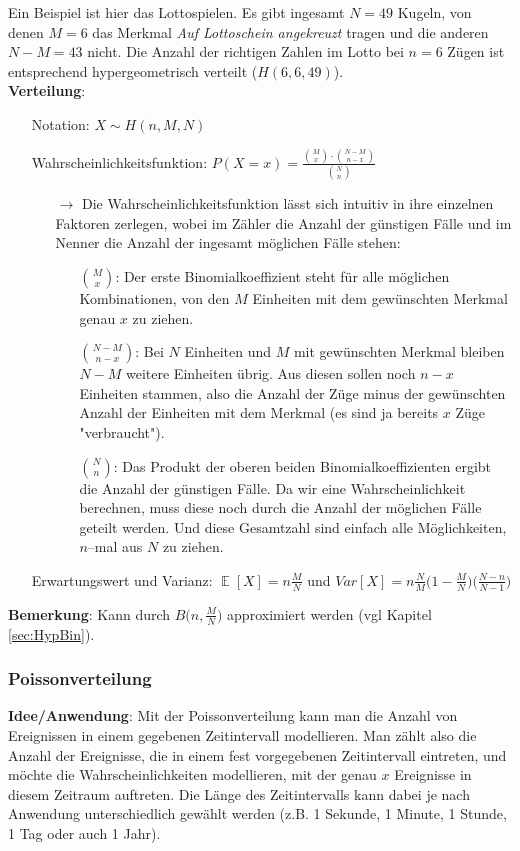 \documentclass[a4paper]{article}
\DeclareMathOperator*{\E}{\mathbb{E}}
\begin{document}
\noindent Ein Beispiel ist hier das Lottospielen. Es gibt ingesamt $N=49$ Kugeln, von denen $M=6$ das Merkmal \textit{Auf Lottoschein angekreuzt} tragen und die anderen $N-M=43$ nicht. Die Anzahl der richtigen Zahlen im Lotto bei $n=6$ Zügen ist entsprechend hypergeometrisch verteilt ($H(6,6,49)$). \\

\noindent \textbf{Verteilung}:
\begin{itemize}
\item[] Notation: $X\sim H(n,M,N)$
\item[] Wahrscheinlichkeitsfunktion: $P(X=x)=\frac{\binom{M}{x}\cdot\binom{N-M}{n-x}}{\binom{N}{n}}$
	\begin{itemize}
	\item[$\rightarrow$] Die Wahrscheinlichkeitsfunktion lässt sich intuitiv in ihre einzelnen Faktoren zerlegen, wobei im Zähler die Anzahl der günstigen Fälle und im Nenner die Anzahl der ingesamt möglichen Fälle stehen:
		\begin{itemize}
		\item[] $\binom{M}{x}$: Der erste Binomialkoeffizient steht für alle möglichen Kombinationen, von den $M$ Einheiten mit dem gewünschten Merkmal genau $x$ zu ziehen.
		\item[] $\binom{N-M}{n-x}$: Bei $N$ Einheiten und $M$ mit gewünschten Merkmal bleiben $N-M$ weitere Einheiten übrig. Aus diesen sollen noch $n-x$ Einheiten stammen, also die Anzahl der Züge minus der gewünschten Anzahl der Einheiten mit dem Merkmal (es sind ja bereits $x$ Züge "verbraucht").
		\item[] $\binom{N}{n}$: Das Produkt der oberen beiden Binomialkoeffizienten ergibt die Anzahl der günstigen Fälle. Da wir eine Wahrscheinlichkeit berechnen, muss diese noch durch die Anzahl der möglichen Fälle geteilt werden. Und diese Gesamtzahl sind einfach alle Möglichkeiten, $n$--mal aus $N$ zu ziehen. 
		\end{itemize}
	\end{itemize}
\item[] Erwartungswert und Varianz: $\E[X]=n\frac{M}{N}$ und $Var[X]=n\frac{N}{M}\Big(1-\frac{M}{N} \Big)\Big(\frac{N-n}{N-1} \Big)$

\end{itemize}

\noindent \textbf{Bemerkung}: Kann durch $B\Big(n,\frac{M}{N}\Big)$ approximiert werden (vgl Kapitel \ref{sec:HypBin}).

\subsubsection{Poissonverteilung} \label{sec:Poi}
\textbf{Idee/Anwendung}: Mit der Poissonverteilung kann man die Anzahl von Ereignissen in einem gegebenen Zeitintervall modellieren. Man zählt also die Anzahl der Ereignisse, die in einem fest vorgegebenen Zeitintervall eintreten, und möchte die Wahrscheinlichkeiten modellieren, mit der genau $x$ Ereignisse in diesem Zeitraum auftreten. Die Länge des Zeitintervalls kann dabei je nach Anwendung unterschiedlich gewählt werden (z.B. 1 Sekunde, 1 Minute, 1 Stunde, 1 Tag oder auch 1 Jahr). \\
\end{document}
